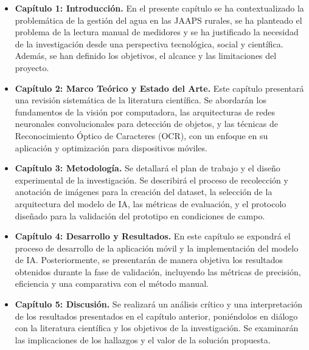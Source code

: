 \begin{itemize}
\item \textbf{Capítulo 1: Introducción.} En el presente capítulo se ha contextualizado la problemática de la gestión del agua en las JAAPS rurales, se ha planteado el problema de la lectura manual de medidores y se ha justificado la necesidad de la investigación desde una perspectiva tecnológica, social y científica. Además, se han definido los objetivos, el alcance y las limitaciones del proyecto.

\item \textbf{Capítulo 2: Marco Teórico y Estado del Arte.} Este capítulo presentará una revisión sistemática de la literatura científica. Se abordarán los fundamentos de la visión por computadora, las arquitecturas de redes neuronales convolucionales para detección de objetos, y las técnicas de Reconocimiento Óptico de Caracteres (OCR), con un enfoque en su aplicación y optimización para dispositivos móviles.

\item \textbf{Capítulo 3: Metodología.} Se detallará el plan de trabajo y el diseño experimental de la investigación. Se describirá el proceso de recolección y anotación de imágenes para la creación del dataset, la selección de la arquitectura del modelo de IA, las métricas de evaluación, y el protocolo diseñado para la validación del prototipo en condiciones de campo.

\item \textbf{Capítulo 4: Desarrollo y Resultados.} En este capítulo se expondrá el proceso de desarrollo de la aplicación móvil y la implementación del modelo de IA. Posteriormente, se presentarán de manera objetiva los resultados obtenidos durante la fase de validación, incluyendo las métricas de precisión, eficiencia y una comparativa con el método manual.

\item \textbf{Capítulo 5: Discusión.} Se realizará un análisis crítico y una interpretación de los resultados presentados en el capítulo anterior, poniéndolos en diálogo con la literatura científica y los objetivos de la investigación. Se examinarán las implicaciones de los hallazgos y el valor de la solución propuesta.
\end{itemize}